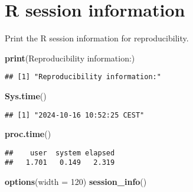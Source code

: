 \documentclass[
]{article}
\newenvironment{Shaded}{\begin{snugshade}}{\end{snugshade}}
\newcommand{\AttributeTok}[1]{\textcolor[rgb]{0.13,0.29,0.53}{#1}}
\newcommand{\DecValTok}[1]{\textcolor[rgb]{0.00,0.00,0.81}{#1}}
\newcommand{\FunctionTok}[1]{\textcolor[rgb]{0.13,0.29,0.53}{\textbf{#1}}}
\newcommand{\NormalTok}[1]{#1}
\newcommand{\StringTok}[1]{\textcolor[rgb]{0.31,0.60,0.02}{#1}}
\begin{document}
\section{R session information}\label{r-session-information}

Print the R session information for reproducibility.

\begin{Shaded}
\begin{Highlighting}[]
\FunctionTok{print}\NormalTok{(}\StringTok{\textquotesingle{}Reproducibility information:\textquotesingle{}}\NormalTok{) }
\end{Highlighting}
\end{Shaded}

\begin{verbatim}
## [1] "Reproducibility information:"
\end{verbatim}

\begin{Shaded}
\begin{Highlighting}[]
\FunctionTok{Sys.time}\NormalTok{()}
\end{Highlighting}
\end{Shaded}

\begin{verbatim}
## [1] "2024-10-16 10:52:25 CEST"
\end{verbatim}

\begin{Shaded}
\begin{Highlighting}[]
\FunctionTok{proc.time}\NormalTok{()}
\end{Highlighting}
\end{Shaded}

\begin{verbatim}
##    user  system elapsed 
##   1.701   0.149   2.319
\end{verbatim}

\begin{Shaded}
\begin{Highlighting}[]
\FunctionTok{options}\NormalTok{(}\AttributeTok{width =} \DecValTok{120}\NormalTok{)}
\FunctionTok{session\_info}\NormalTok{()}
\end{Highlighting}
\end{Shaded}
\end{document}

